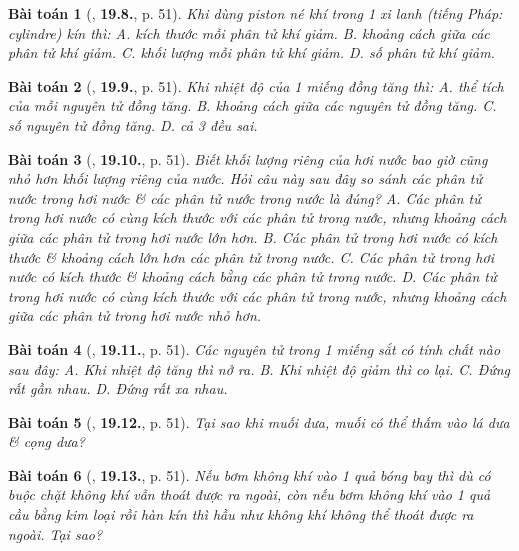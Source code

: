 \documentclass{article}
\numberwithin{equation}{section}
\newtheorem{baitoan}{Bài toán}
\begin{document}
\begin{baitoan}[\cite{SBT_Vat_Ly_8}, \textbf{19.8.}, p. 51]
	Khi dùng piston né khí trong 1 xi lanh (tiếng Pháp: \emph{cylindre}) kín thì: {\sf A.} kích thước mỗi phân tử khí giảm. {\sf B.} khoảng cách giữa các phân tử khí giảm. {\sf C.} khối lượng mỗi phân tử khí giảm. {\sf D.} số phân tử khí giảm.
\end{baitoan}

\begin{baitoan}[\cite{SBT_Vat_Ly_8}, \textbf{19.9.}, p. 51]
	Khi nhiệt độ của 1 miếng đồng tăng thì: {\sf A.} thể tích của mỗi nguyên tử đồng tăng. {\sf B.} khoảng cách giữa các nguyên tử đồng tăng. {\sf C.} số nguyên tử đồng tăng. {\sf D.} cả 3 đều sai.
\end{baitoan}

\begin{baitoan}[\cite{SBT_Vat_Ly_8}, \textbf{19.10.}, p. 51]
	Biết khối lượng riêng của hơi nước bao giờ cũng nhỏ hơn khối lượng riêng của nước. Hỏi câu này sau đây so sánh các phân tử nước trong hơi nước \& các phân tử nước trong nước là đúng? {\sf A.} Các phân tử trong hơi nước có cùng kích thước với các phân tử trong nước, nhưng khoảng cách giữa các phân tử trong hơi nước lớn hơn. {\sf B.} Các phân tử trong hơi nước có kích thước \& khoảng cách lớn hơn các phân tử trong nước. {\sf C.} Các phân tử trong hơi nước có kích thước \& khoảng cách bằng các phân tử trong nước. {\sf D.} Các phân tử trong hơi nước có cùng kích thước với các phân tử trong nước, nhưng khoảng cách giữa các phân tử trong hơi nước nhỏ hơn.
\end{baitoan}

\begin{baitoan}[\cite{SBT_Vat_Ly_8}, \textbf{19.11.}, p. 51]
	Các nguyên tử trong 1 miếng sắt có tính chất nào sau đây: {\sf A.} Khi nhiệt độ tăng thì nở ra. {\sf B.} Khi nhiệt độ giảm thì co lại. {\sf C.} Đứng rất gần nhau. {\sf D.} Đứng rất xa nhau.
\end{baitoan}

\begin{baitoan}[\cite{SBT_Vat_Ly_8}, \textbf{19.12.}, p. 51]
	Tại sao khi muối dưa, muối có thể thấm vào lá dưa \& cọng dưa?
\end{baitoan}

\begin{baitoan}[\cite{SBT_Vat_Ly_8}, \textbf{19.13.}, p. 51]
	Nếu bơm không khí vào 1 quả bóng bay thì dù có buộc chặt không khí vẫn thoát được ra ngoài, còn nếu bơm không khí vào 1 quả cầu bằng kim loại rồi hàn kín thì hầu như không khí không thể thoát được ra ngoài. Tại sao?
\end{baitoan}
\end{document}

